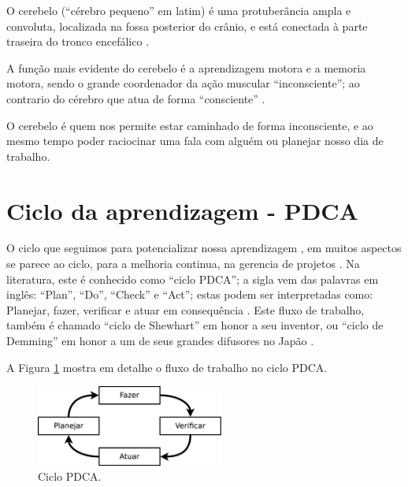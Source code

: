 \begin{elaboracion}[title=O cerebelo e o comportamento inconsciente, width= 1.00\linewidth]
O cerebelo (``cérebro pequeno'' em latim) é uma protuberância ampla e convoluta,
localizada na fossa posterior do crânio, 
e está conectada à parte traseira do tronco encefálico \cite[pp. 93]{gazzanigaciencia} \cite[pp. 87]{carneiro2004atlas}
\cite[pp. 516]{bearneurociencias}.

A função mais evidente do cerebelo é a aprendizagem motora e a memoria motora,
sendo o grande coordenador da ação muscular ``inconsciente'';
ao contrario do cérebro que atua de forma ``consciente'' 
\cite[pp. 93]{gazzanigaciencia} \cite[pp. 87]{carneiro2004atlas} \cite[pp. 516]{bearneurociencias}.

O cerebelo é quem nos permite estar caminhado de forma inconsciente,
e ao mesmo tempo poder raciocinar uma fala com alguém ou planejar nosso dia de trabalho.
\end{elaboracion}



\section{Ciclo da aprendizagem - PDCA}
\label{sec:cicloaprendizagem}
O ciclo que seguimos para potencializar nossa aprendizagem \cite[pp. 13]{mumford2001aprendendo},
em muitos aspectos se parece ao ciclo, para a melhoria continua, na gerencia de projetos 
\cite[pp. 4]{caloba2018gerenciamento} \cite[pp. 59]{teixeira2018gestao}.
Na literatura, este é conhecido como ``ciclo PDCA'';
a sigla vem das palavras em inglês: ``Plan'', ``Do'', ``Check'' e ``Act'';
estas podem ser interpretadas como: Planejar, fazer, verificar e atuar em consequência
\cite[pp. 59]{teixeira2018gestao} \cite[pp. 4]{caloba2018gerenciamento}.
Este fluxo de trabalho, também é chamado ``ciclo de Shewhart'' em honor a seu inventor,
ou ``ciclo de Demming'' em honor a um de seus grandes difusores no Japão
\cite[pp. 59]{teixeira2018gestao} \cite[pp. 4]{caloba2018gerenciamento}.

A Figura \ref{fig:ciclopdca} mostra em detalhe o fluxo de trabalho no ciclo PDCA.
\begin{figure}[!h]
  \centering
    \includegraphics[width=0.55\textwidth]{chapters/cap-learning/ciclo2.eps}
\caption{Ciclo PDCA.}
\label{fig:ciclopdca}
\end{figure}

